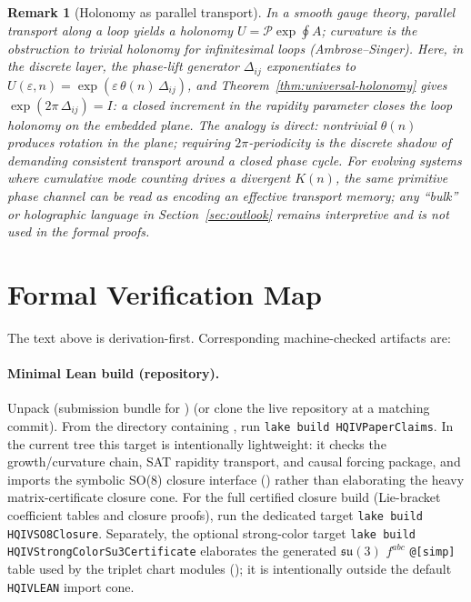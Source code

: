 \documentclass[11pt]{amsart}
\newcommand{\PaperArtifactBundleZip}{\ReleaseDistArchive}
\newtheorem{remark}[theorem]{Remark}
\begin{document}
\begin{remark}[Holonomy as parallel transport]
In a smooth gauge theory, parallel transport along a loop yields a holonomy \(U=\mathcal P\exp\oint A\); curvature is the obstruction to trivial holonomy for infinitesimal loops (Ambrose--Singer). Here, in the discrete layer, the phase-lift generator \(\Delta_{ij}\) exponentiates to \(U(\varepsilon,n)=\exp(\varepsilon\,\theta(n)\,\Delta_{ij})\), and Theorem~\ref{thm:universal-holonomy} gives \(\exp(2\pi\,\Delta_{ij})=I\): a \emph{closed} increment in the rapidity parameter closes the loop holonomy on the embedded plane. The analogy is direct: nontrivial \(\theta(n)\) produces rotation in the plane; requiring \(2\pi\)-periodicity is the discrete shadow of demanding consistent transport around a closed phase cycle. For evolving systems where cumulative mode counting drives a divergent \(K(n)\), the same primitive phase channel can be read as encoding an effective transport memory; any ``bulk'' or holographic language in Section~\ref{sec:outlook} remains interpretive and is not used in the formal proofs.
\end{remark}

\appendix
\section{Formal Verification Map}

The text above is derivation-first. Corresponding machine-checked artifacts are:

\paragraph{Minimal Lean build (repository).}
Unpack \PaperArtifactBundleZip{} (submission bundle for ) (or clone the live \cite{hqiv-lean} repository at a matching commit). From the directory containing , run \texttt{lake build HQIVPaperClaims}. In the current tree this target is intentionally lightweight: it checks the growth/curvature chain, SAT rapidity transport, and causal forcing package, and imports the symbolic SO(8) closure interface () rather than elaborating the heavy matrix-certificate closure cone.
For the full certified closure build (Lie-bracket coefficient tables and closure proofs), run the dedicated target \texttt{lake build HQIVSO8Closure}.
Separately, the optional strong-color target \texttt{lake build HQIVStrongColorSu3Certificate} elaborates the generated \(\mathfrak{su}(3)\) \(f^{abc}\) \texttt{@[simp]} table used by the triplet chart modules (); it is intentionally outside the default \texttt{HQIVLEAN} import cone.
\end{document}
